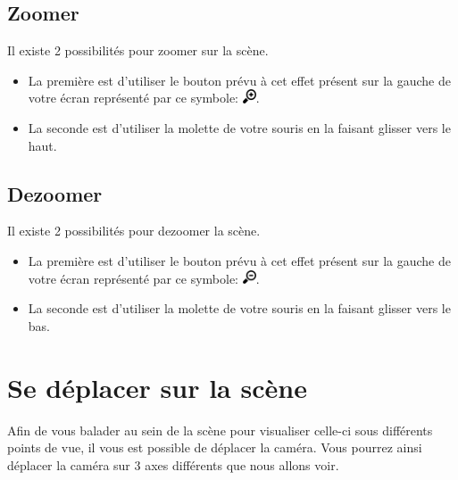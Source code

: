 \documentclass[11pt]{report}
\begin{document}

\subsection{Zoomer}

\hypertarget{zoom}{Il existe 2 possibilités pour zoomer sur la scène.}
\begin{itemize}
        \item La première est d'utiliser le bouton prévu à cet effet présent sur la gauche de votre écran représenté par ce symbole: \includegraphics[width=0.4cm]{./btn_zoom-in.png}.
        \item La seconde est d'utiliser la molette de votre souris en la faisant glisser vers le haut.
\end{itemize}

\subsection{Dezoomer}

\hypertarget{dezoom}{Il existe 2 possibilités pour dezoomer la scène.}

\begin{itemize}
        \item La première est d'utiliser le bouton prévu à cet effet présent sur la gauche de votre écran représenté par ce symbole: \includegraphics[width=0.4cm]{./btn_zoom-out.png}.
        \item La seconde est d'utiliser la molette de votre souris en la faisant glisser vers le bas.
\end{itemize}



\section{Se déplacer sur la scène}

Afin de vous balader au sein de la scène pour visualiser celle-ci sous différents points de vue, il vous est possible de déplacer la caméra. Vous pourrez ainsi déplacer la caméra sur 3 axes différents que nous allons voir.
\end{document}

